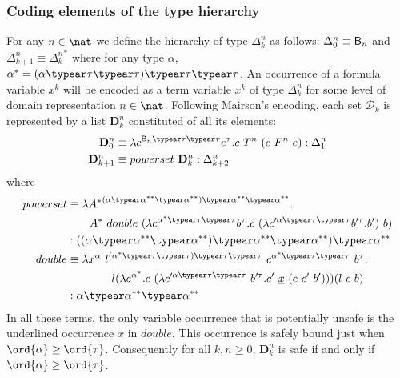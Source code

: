 \subsubsection{Coding elements of the type hierarchy}
For any $n\in\nat$ we define the hierarchy of type $\Delta_k^n$ as
follows: $\Delta_0^n \equiv \mathsf{B}_n$ and $\Delta_{k+1}^n \equiv
{\Delta_k^n}^*$ where for any type $\alpha$, $\alpha^* = (\alpha
\typear \tau \typear \tau)\typear \tau \typear \tau$. An occurrence
of a formula variable $x^k$ will be encoded as a term variable $x^k$
of type $\Delta_{k}^n$ for some level of domain representation
$n\in\nat$. Following Mairson's  encoding, each set $\mathcal{D}_k$
is represented by a list $\mathbf{D}_k^n$ constituted of all its
elements:
\begin{align*}
\mathbf{D}_0^n &\equiv \lambda c^{\booltype_n \typear \tau \typear \tau} e^\tau . c~T^n~(c~F^n~e) : \Delta_1^n \\
\mathbf{D}_{k+1}^n &\equiv powerset~\mathbf{D}_k^n : \Delta_{k+2}^n
\end{align*}
where
\begin{align*}
  powerset &\equiv \lambda {A^*}^{(\alpha \typear \alpha^{**} \typear \alpha^{**}) \typear \alpha^{**} \typear \alpha^{**}}. \\
&\qquad  A^*~double~(\lambda c^{\alpha^* \typear \tau\typear \tau} b^\tau . c~(\lambda c'^{\alpha\typear \tau\typear \tau} b'^\tau.b')~b)\\
 &: ((\alpha \typear \alpha^{**} \typear \alpha^{**}) \typear \alpha^{**} \typear \alpha^{**})\typear \alpha^{**} \\
  double &\equiv \lambda x^\alpha~l^{(\alpha^* \typear \tau\typear \tau)\typear \tau\typear \tau}~ c^{\alpha^*\typear \tau\typear \tau}~b^\tau. \\
  & \qquad \qquad l(\lambda e^{\alpha^*}.c~(\lambda c'^{\alpha\typear \tau\typear \tau}~ b'^\tau.c'~\underline{x}~(e~c'~b')))(l~c~b)\\
 &: \alpha \typear \alpha^{**} \typear \alpha^{**}
\end{align*}
In all these terms, the only variable occurrence that is potentially
unsafe is the underlined occurrence $x$ in $double$. This occurrence
is safely bound just when $\ord{\alpha} \geq \ord{\tau}$.
Consequently for all $k,n\geq0$, $\mathbf{D}_k^n$ is safe if and
only if $\ord{\alpha} \geq \ord{\tau}$.


